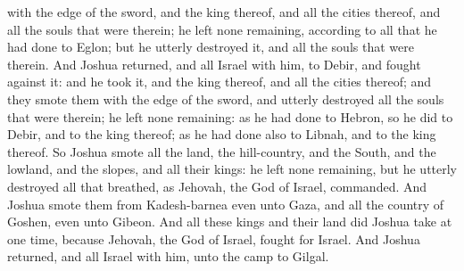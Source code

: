 with the edge of the sword, and the king thereof, and all the cities thereof, and all the souls that were therein; he left none remaining, according to all that he had done to Eglon; but he utterly destroyed it, and all the souls that were therein.  And Joshua returned, and all Israel with him, to Debir, and fought against it: and he took it, and the king thereof, and all the cities thereof; and they smote them with the edge of the sword, and utterly destroyed all the souls that were therein; he left none remaining: as he had done to Hebron, so he did to Debir, and to the king thereof; as he had done also to Libnah, and to the king thereof.  So Joshua smote all the land, the hill-country, and the South, and the lowland, and the slopes, and all their kings: he left none remaining, but he utterly destroyed all that breathed, as Jehovah, the God of Israel, commanded. And Joshua smote them from Kadesh-barnea even unto Gaza, and all the country of Goshen, even unto Gibeon. And all these kings and their land did Joshua take at one time, because Jehovah, the God of Israel, fought for Israel. And Joshua returned, and all Israel with him, unto the camp to Gilgal. 

